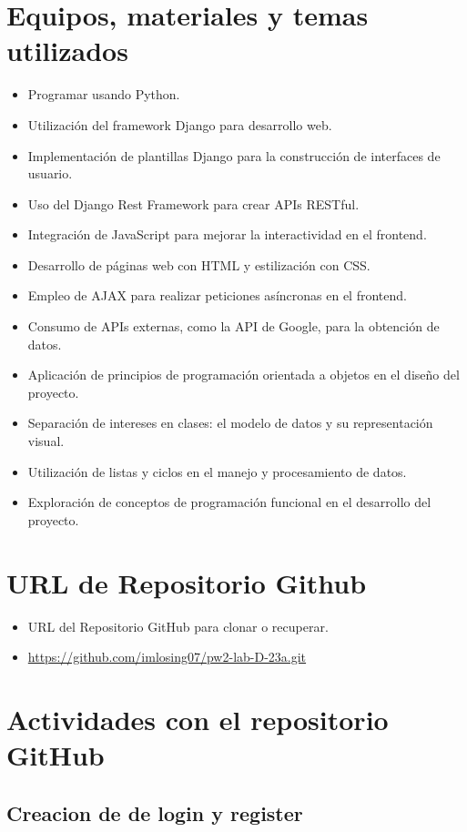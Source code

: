 \documentclass{article}
\begin{document}
	\section{Equipos, materiales y temas utilizados}
\begin{itemize}
    \item Programar usando Python.
    \item Utilización del framework Django para desarrollo web.
    \item Implementación de plantillas Django para la construcción de interfaces de usuario.
    \item Uso del Django Rest Framework para crear APIs RESTful.
    \item Integración de JavaScript para mejorar la interactividad en el frontend.
    \item Desarrollo de páginas web con HTML y estilización con CSS.
    \item Empleo de AJAX para realizar peticiones asíncronas en el frontend.
    \item Consumo de APIs externas, como la API de Google, para la obtención de datos.
    \item Aplicación de principios de programación orientada a objetos en el diseño del proyecto.
    \item Separación de intereses en clases: el modelo de datos y su representación visual.
    \item Utilización de listas y ciclos en el manejo y procesamiento de datos.
    \item Exploración de conceptos de programación funcional en el desarrollo del proyecto.
\end{itemize}

	\section{URL de Repositorio Github}
	\begin{itemize}
		\item URL del Repositorio GitHub para clonar o recuperar.
		\item \url{https://github.com/imlosing07/pw2-lab-D-23a.git}
	\end{itemize}

	\section{Actividades con el repositorio GitHub}

	\subsection{Creacion de de login y register}
\end{document}
